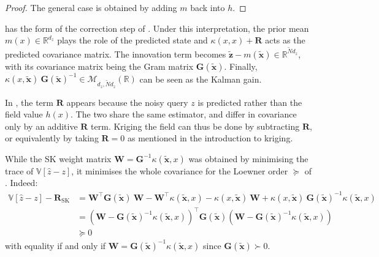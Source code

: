 \begin{proof}
	The general case is obtained by adding $m$ back into $h$.
\end{proof}

\begin{remark}
	 has the form of the correction step of . Under this interpretation, the prior mean ${m(x)\in\mathbb{R}^{d_z}}$ plays the role of the predicted state and $\kappa(x,x)+\mathbf{R}$ acts as the predicted covariance matrix. The innovation term becomes $\tilde{\mathbf{z}}-m(\tilde{\mathbf{x}})\in\mathbb{R}^{\tilde{N}d_z}$, with its covariance matrix being the Gram matrix $\mathbf{G}(\tilde{\mathbf{x}})$. Finally, $\kappa(x,\tilde{\mathbf{x}})\:\mathbf{G}(\tilde{\mathbf{x}})^{-1}\in\mathcal{M}_{d_z,\tilde{N}d_z}(\mathbb{R})$ can be seen as the Kalman gain.
\end{remark}

\begin{remark}
	In , the term $\mathbf{R}$ appears because the noisy query $z$ is predicted rather than the field value $h(x)$. The two share the same estimator, and differ in covariance only by an additive $\mathbf{R}$ term. Kriging the field can thus be done by subtracting $\mathbf{R}$, or equivalently by taking $\mathbf{R}=0$ as mentioned in the introduction to kriging.
\end{remark}

\begin{remark}
	While the SK weight matrix $\mathbf{W}=\mathbf{G}^{-1}\kappa(\tilde{\mathbf{x}},x)$ was obtained by minimising the trace of $\mathbb{V}[\hat{z}-z]$, it minimises the whole covariance for the Loewner order $\succeq$ of . Indeed:
	\begin{equation}
		\begin{aligned}
		\mathbb{V}[\hat{z}-z]-\mathbf{R}_{\mathrm{SK}}&=\mathbf{W}^\top \mathbf{G}(\tilde{\mathbf{x}})\:\mathbf{W}-\mathbf{W}^\top \kappa(\tilde{\mathbf{x}},x)-\kappa(x,\tilde{\mathbf{x}})\:\mathbf{W}+\kappa(x,\tilde{\mathbf{x}})\:\mathbf{G}(\tilde{\mathbf{x}})^{-1}\kappa(\tilde{\mathbf{x}},x)\\
		&=\left(\mathbf{W}-\mathbf{G}(\tilde{\mathbf{x}})^{-1}\kappa(\tilde{\mathbf{x}},x)\right)^\top \mathbf{G}(\tilde{\mathbf{x}})\left(\mathbf{W}-\mathbf{G}(\tilde{\mathbf{x}})^{-1}\kappa(\tilde{\mathbf{x}},x)\right)\\
		&\succeq0
		\end{aligned}
	\end{equation}
	with equality if and only if $\mathbf{W}=\mathbf{G}(\tilde{\mathbf{x}})^{-1}\kappa(\tilde{\mathbf{x}},x)$ since $\mathbf{G}(\tilde{\mathbf{x}})\succ0$.
\end{remark}

